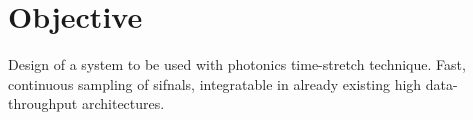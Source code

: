 \section{Objective}
Design of a system to be used with photonics time-stretch technique. Fast, continuous sampling of sifnals, integratable in already existing high data-throughput architectures.






%









